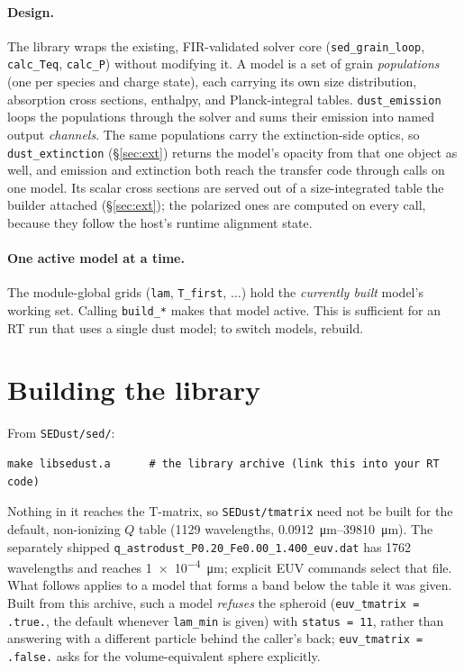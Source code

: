\documentclass{my_memo}
\newcommand{\code}[1]{\texttt{#1}}
\begin{document}
\paragraph{Design.} The library wraps the existing, FIR-validated solver core
(\code{sed\_grain\_loop}, \code{calc\_Teq}, \code{calc\_P}) without modifying it.
A model is a set of grain \emph{populations} (one per species and charge state),
each carrying its own size distribution, absorption cross sections, enthalpy, and
Planck-integral tables. \code{dust\_emission} loops the populations through the
solver and sums their emission into named output \emph{channels}. The same
populations carry the extinction-side optics, so \code{dust\_extinction}
(\S\ref{sec:ext}) returns the model's opacity from that one object as well, and
emission and extinction both reach the transfer code through calls on one
model. Its scalar cross sections are served out of a size-integrated table the
builder attached (\S\ref{sec:ext}); the polarized ones are computed on every
call, because they follow the host's runtime alignment state.

\paragraph{One active model at a time.} The module-global grids
(\code{lam}, \code{T\_first}, $\dots$) hold the \emph{currently built} model's
working set. Calling \code{build\_*} makes that model active. This is sufficient
for an RT run that uses a single dust model; to switch models, rebuild.

\section{Building the library}\label{sec:build}

From \code{SEDust/sed/}:
\begin{lstlisting}[style=sh]
make libsedust.a      # the library archive (link this into your RT code)
\end{lstlisting}

Nothing in it reaches the T-matrix, so \code{SEDust/tmatrix} need not be built
for the default, non-ionizing $Q$ table (1129 wavelengths,
\SIrange{0.0912}{39810}{\micro\meter}).  The separately shipped
\code{q\_astrodust\_P0.20\_Fe0.00\_1.400\_euv.dat} has 1762 wavelengths and
reaches \SI{1e-4}{\micro\meter}; explicit EUV commands select that file.
What follows applies to a model that forms a band below the table it was given.
Built from this archive, such a model
\emph{refuses} the spheroid (\code{euv\_tmatrix = .true.}, the default whenever
\code{lam\_min} is given) with \code{status = 11}, rather than answering with a
different particle behind the caller's back; \code{euv\_tmatrix = .false.} asks
for the volume-equivalent sphere explicitly.
\end{document}
